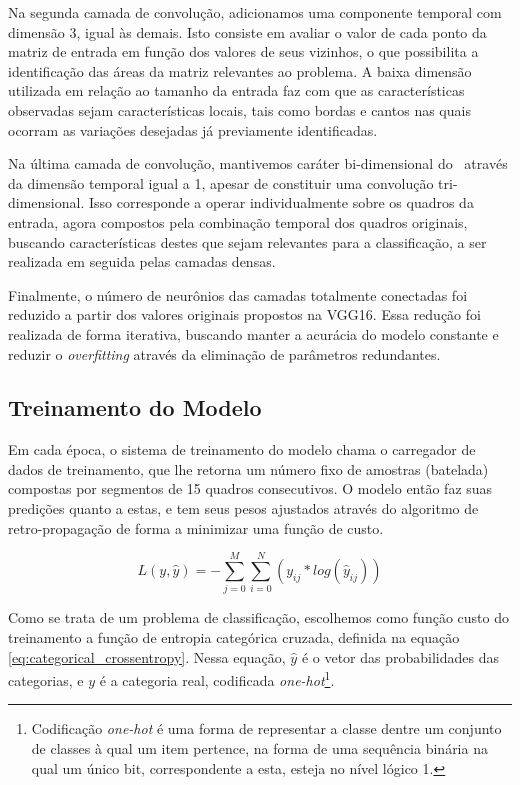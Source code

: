 Na segunda camada de convolução, adicionamos uma componente temporal com dimensão 3, igual às demais.
Isto consiste em avaliar o valor de cada ponto da matriz de entrada em função dos valores de seus vizinhos, o que possibilita a identificação das áreas da matriz relevantes ao problema.
A baixa dimensão utilizada em relação ao tamanho da entrada faz com que as características observadas sejam características locais, tais como bordas e cantos nas quais ocorram as variações desejadas já previamente identificadas.

Na última camada de convolução, mantivemos caráter bi-dimensional do \ através da dimensão temporal igual a 1, apesar de constituir uma convolução tri-dimensional.
Isso corresponde a operar individualmente sobre os quadros da entrada, agora compostos pela combinação temporal dos quadros originais, buscando características destes que sejam relevantes para a classificação, a ser realizada em seguida pelas camadas densas.

Finalmente, o número de neurônios das camadas totalmente conectadas foi reduzido a partir dos valores originais propostos na VGG16.
Essa redução foi realizada de forma iterativa, buscando manter a acurácia do modelo constante e reduzir o \textit{overfitting} através da eliminação de parâmetros redundantes.

\subsection{Treinamento do Modelo}
\label{sec:train-flow}

Em cada época, o sistema de treinamento do modelo chama o carregador de dados de treinamento, que lhe retorna um número fixo de amostras (batelada) compostas por segmentos de 15 quadros consecutivos.
O modelo então faz suas predições quanto a estas, e tem seus pesos ajustados através do algoritmo de retro-propagação de forma a minimizar uma função de custo.

\begin{equation} \label{eq:categorical_crossentropy}
    L(y,\hat{y})=-\sum\limits_{j=0}^M\sum\limits_{i=0}^N(y_{ij}*log(\hat{y}_{ij}))
\end{equation}

Como se trata de um problema de classificação, escolhemos como função custo do treinamento a função de entropia categórica cruzada, definida na equação \ref{eq:categorical_crossentropy}. Nessa equação, $\hat{y}$ é o vetor das probabilidades das categorias, e $y$ é a categoria real, codificada \textit{one-hot}\footnote{Codificação \textit{one-hot} é uma forma de representar a classe dentre um conjunto de classes à qual um item pertence, na forma de uma sequência binária na qual um único bit, correspondente a esta, esteja no nível lógico 1.}.

